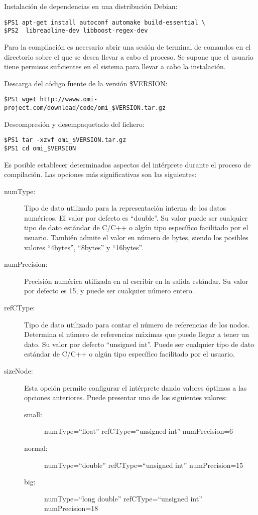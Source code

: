 Instalación de dependencias en una distribución Debian:
\lstset {language=bash}
\begin{lstlisting}
$PS1 apt-get install autoconf automake build-essential \
$PS2  libreadline-dev libboost-regex-dev
\end{lstlisting}

Para la compilación es necesario abrir una sesión de terminal de comandos en el directorio sobre el
que se desea llevar a cabo el proceso. Se supone que el usuario tiene permisos suficientes en el 
sistema para llevar a cabo la instalación.

Descarga del código fuente de la versión \$VERSION:
\begin{lstlisting}
$PS1 wget http://wwww.omi-project.com/download/code/omi_$VERSION.tar.gz
\end{lstlisting}
\pagebreak

Descompresión y desempaquetado del fichero:
\begin{lstlisting}
$PS1 tar -xzvf omi_$VERSION.tar.gz
$PS1 cd omi_$VERSION
\end{lstlisting}

Es posible establecer determinados aspectos del intérprete durante el proceso de compilación. Las opciones 
más significativas son las siguientes:

\begin{description}
\item [numType:] Tipo de dato utilizado para la representación interna de los datos numéricos. El valor por defecto es ``double''.
Su valor puede ser cualquier tipo de dato estándar de C/C++ o algún tipo específico facilitado por el usuario. También admite el
valor en número de bytes, siendo los posibles valores ``4bytes'', ``8bytes'' y ``16bytes''.
\item [numPrecision:] Precisión numérica utilizada en al escribir en la salida estándar. Su valor por defecto es 15, y puede ser cualquier número entero.
\item [refCType:] Tipo de dato utilizado para contar el número de referencias de los nodos. Determina el número de referencias máximas que puede llegar a tener un 
dato. Su valor por defecto ``unsigned int''. Puede ser cualquier tipo de dato estándar de C/C++ o  algún tipo específico facilitado por el usuario.
\item [sizeNode:] Esta opción permite configurar el intérprete dando valores óptimos a las opciones anteriores. Puede presentar uno de los siguientes valores:
\begin{description}
\item [small:] numType=``float'' refCType=``unsigned int'' numPrecision=6
\item [normal:] numType=``double'' refCType=``unsigned int'' numPrecision=15
\item [big:] numType=``long double'' refCType=``unsigned int'' numPrecision=18
\end{description}
\end{description}

